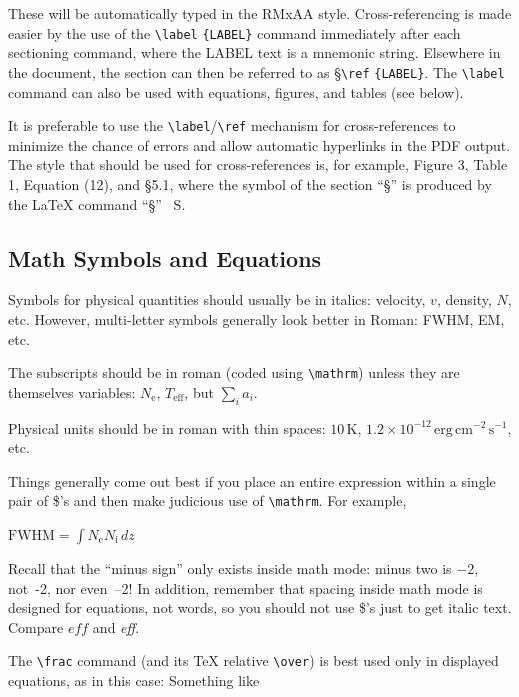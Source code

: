\documentclass[9pt,twoside]{rmaa-rho-class/rmaa-rho_light}
\newcommand{\CS}[1]{\texttt{\textbackslash #1}}
\newenvironment{Example}
{\begin{list}{}{\setlength{\leftmargin}{10pt}\setlength{\rightmargin}{10pt}}%
  \item[]\itshape}
  {\end{list}}
\begin{document}
    These will be automatically typed in the RMxAA style. Cross-referencing is made easier by the use of the \CS{label} \verb+{LABEL}+ command immediately after each sectioning command, where the LABEL text is a mnemonic string. Elsewhere in the document, the section can then be referred to as \S \CS{ref} \verb+{LABEL}+. The \CS{label} command can also be used with equations, figures, and tables (see below). 

    It is preferable to use the \CS{label}/\CS{ref} mechanism for cross-references to minimize the chance of errors and allow automatic hyperlinks in the PDF output. The style that should be used for cross-references is, for example, Figure 3, Table 1, Equation (12), and \S 5.1, where the symbol of the section “§” is produced by the \LaTeX{} command “\S” \ S.

    \subsection{Math Symbols and Equations} \label{sec:math}

        Symbols for physical quantities should usually be in italics: velocity, $v$, density, $N$, etc. However, multi-letter symbols generally look better in Roman: FWHM, EM, etc. 
    
        The subscripts should be in roman (coded using \CS{mathrm}) unless they are themselves variables: $N_\mathrm{e}$, $T_\mathrm{eff}$, but $\sum_i a_i$. 
        
        Physical units should be in roman with thin spaces: $10\,\mathrm{K}$, $1.2\times10^{-12}\,\mathrm{erg\,cm^{-2}\,s^{-1}}$, etc. 
    
        Things generally come out best if you place an entire expression within a single pair of \$'s and then make judicious use of \CS{mathrm}. For example,
    
        \begin{Example}
          $ \mathrm{FWHM} = \int N_\mathrm{e} N_\mathrm{i} \, dz $ 
        \end{Example}
    
        Recall that the ``minus sign'' only exists inside math mode: minus two is $-2$, not~-2, nor \hbox{even --2!} In addition, remember that spacing inside math mode is designed for equations, not words, so you should not use \$'s just to get italic text. Compare $eff$ and \textit{eff}. 
    
        The \CS{frac} command (and its \TeX{} relative \CS{over}) is best used only in displayed equations, as in this case: Something like 
    
\end{document}

